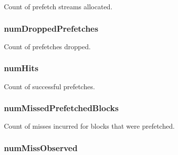 Count of prefetch streams allocated. \hypertarget{classPrefetcher_a4165aaa9b3590259a258114e9469c74e}{
\subsubsection[{numDroppedPrefetches}]{ {\bf numDroppedPrefetches}}}
\label{classPrefetcher_a4165aaa9b3590259a258114e9469c74e}


Count of prefetches dropped. \hypertarget{classPrefetcher_a1651af6d8d96734f82a6e95a8aea4af0}{
\subsubsection[{numHits}]{ {\bf numHits}}}
\label{classPrefetcher_a1651af6d8d96734f82a6e95a8aea4af0}


Count of successful prefetches. \hypertarget{classPrefetcher_a7131480b702efc8b888a80270c77aab2}{
\subsubsection[{numMissedPrefetchedBlocks}]{ {\bf numMissedPrefetchedBlocks}}}
\label{classPrefetcher_a7131480b702efc8b888a80270c77aab2}


Count of misses incurred for blocks that were prefetched. \hypertarget{classPrefetcher_ad1e6c9fb59c342c342de2ec92e395174}{
\subsubsection[{numMissObserved}]{ {\bf numMissObserved}}}
\label{classPrefetcher_ad1e6c9fb59c342c342de2ec92e395174}


